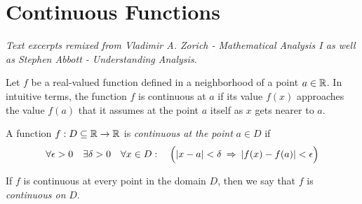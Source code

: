 \section{Continuous Functions}

\textit{Text excerpts remixed from Vladimir A. Zorich - Mathematical Analysis I as well as Stephen Abbott - Understanding Analysis.}

Let $f$ be a real-valued function defined in a neighborhood of a point $a \in \R$. In intuitive terms, the function $f$ is continuous at $a$ if its value $f(x)$ approaches the value $f(a)$ that it assumes at the point $a$ itself as $x$ gets nearer to $a$.

\begin{definition}
    A function $f: D\subseteq \R \to \R$ is \textit{continuous at the point} $a \in D$ if
    \begin{align}
        \forall \epsilon > 0 \quad \exists \delta > 0
        \quad \forall x \in D: \quad
        \Bigl(|x - a| < \delta \: \implies \: |f(x) - f(a)| < \epsilon \Bigr)
    \end{align}

    If $f$ is continuous at every point in the domain $D$, then we say that $f$ is \textit{continuous on} $D$.
\end{definition}
